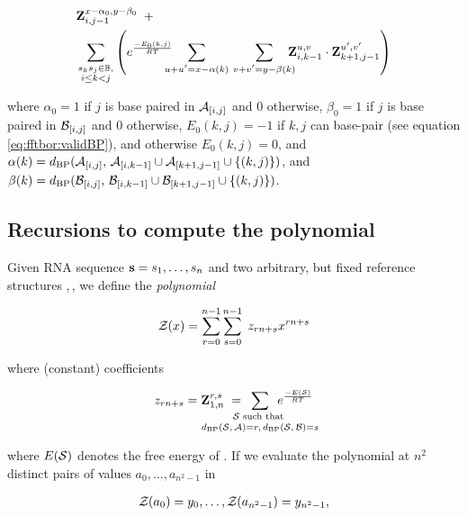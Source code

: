 \begin{align}
\label{eq:ffttwo:bfZabij}
\begin{split}
& \bfZ{x-\alpha_0,y-\beta_0}{i,j-1}\enspace + \\
& \sum_{\substack{s_k s_j \in \bpSet, \\ i \le k<j}}
\left(
\boltzNuss{k,j}\quad
\sum_{\mathclap{u+u'=x-\alpha(k)}}\hspace{3.75em}
\sum_{\mathclap{v+v'=y-\beta(k)}}\quad
\bfZ{u,v}{i,k-1} \cdot \bfZ{u',v'}{k+1,j-1}
\right)
\end{split}
\end{align}

where $\alpha_0 = 1$ if $j$ is base paired in $\mathcal A_{[i,j]}$ and $0$ otherwise,
$\beta_0 = 1$ if $j$ is base paired in $\mathcal B_{[i,j]}$ and $0$ otherwise,
$E_0(k,j)=-1$ if $k,j$ can base-pair
(see equation \ref{eq:fftbor:validBP}), and otherwise $E_0(k,j)=0$, and
$\alpha(k) =
d_{\text{BP}}(\mathcal A_{[i,j]},\,\mathcal A_{[i,k-1]} \cup \mathcal A_{[k+1,j-1]} \cup \{ (k,j) \})$,
and
$\beta(k) =
d_{\text{BP}}(\mathcal B_{[i,j]},\,\mathcal B_{[i,k-1]} \cup \mathcal B_{[k+1,j-1]} \cup \{ (k,j) \})$.

\subsection{Recursions to compute the polynomial
\texorpdfstring{}{}}
\label{subsec:ffttwo:polynomial}

Given RNA sequence ${\bf s} = s_1,\dots,s_n$
and two arbitrary, but fixed reference
structures \strA,\,\strB, we define the {\em polynomial}

\begin{align}
\label{eq:ffttwo:zOfX}
\emZ{} = \sum_{r=0}^{n-1} \sum_{s=0}^{n-1}\; z_{rn+s} x^{rn+s}
\end{align}

where (constant) coefficients

\begin{align}
z_{rn+s} = \bfZ{r,s}{1,n}\;=
\enspace\sum_{\mathclap{\substack{
\str \text{ such that } \rule[-.5ex]{0pt}{0pt} \\
\dBP{\str}{\strA} = r,\,\dBP{\str}{\strB} = s
}}}\enspace
\boltzF{\str}
\end{align}

where $E(\mathcal S)$ denotes the free energy of \str.
If we evaluate the polynomial \emZ{} at $n^2$ distinct pairs of values
$a_0,\dots,a_{n^2-1}$ in

\begin{align}
\label{eq:ffttwo:solutionsForAlpha}
\emZof{}{a_0} = y_{0}, \dots, \emZof{}{a_{n^2-1}} = y_{n^2-1},
\end{align}

